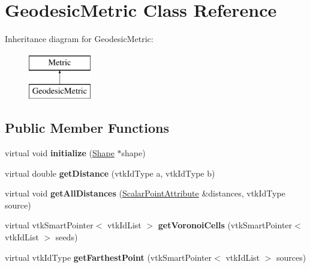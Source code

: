 \hypertarget{class_geodesic_metric}{}\section{Geodesic\+Metric Class Reference}
\label{class_geodesic_metric}
Inheritance diagram for Geodesic\+Metric\+:\begin{figure}[H]
\begin{center}
\leavevmode
\includegraphics[height=2.000000cm]{class_geodesic_metric}
\end{center}
\end{figure}
\subsection*{Public Member Functions}
\begin{DoxyCompactItemize}
\item 
\hypertarget{class_geodesic_metric_abf3bc74380d3bc25428e1f18e635ff92}{}virtual void {\bfseries initialize} (\hyperlink{class_shape}{Shape} $\ast$shape)\label{class_geodesic_metric_abf3bc74380d3bc25428e1f18e635ff92}

\item 
\hypertarget{class_geodesic_metric_a654c8a9b8b6a091134b4108c619ccc91}{}virtual double {\bfseries get\+Distance} (vtk\+Id\+Type a, vtk\+Id\+Type b)\label{class_geodesic_metric_a654c8a9b8b6a091134b4108c619ccc91}

\item 
\hypertarget{class_geodesic_metric_aff4a4dc1b147c31c074262e89d412ec4}{}virtual void {\bfseries get\+All\+Distances} (\hyperlink{class_scalar_point_attribute}{Scalar\+Point\+Attribute} \&distances, vtk\+Id\+Type source)\label{class_geodesic_metric_aff4a4dc1b147c31c074262e89d412ec4}

\item 
\hypertarget{class_geodesic_metric_a1cd4191f24b7e5e06aec166db9e26b6c}{}virtual vtk\+Smart\+Pointer$<$ vtk\+Id\+List $>$ {\bfseries get\+Voronoi\+Cells} (vtk\+Smart\+Pointer$<$ vtk\+Id\+List $>$ seeds)\label{class_geodesic_metric_a1cd4191f24b7e5e06aec166db9e26b6c}

\item 
\hypertarget{class_geodesic_metric_a7215349bd977395f2dd27c6a6b5959bf}{}virtual vtk\+Id\+Type {\bfseries get\+Farthest\+Point} (vtk\+Smart\+Pointer$<$ vtk\+Id\+List $>$ sources)\label{class_geodesic_metric_a7215349bd977395f2dd27c6a6b5959bf}

\end{DoxyCompactItemize}
